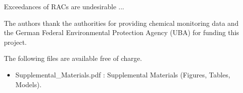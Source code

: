 \documentclass[journal=esthag,manuscript=article]{achemso}
\begin{document}







Exceedances of RACs are undesirable ...




\begin{acknowledgement}
The authors thank the authorities for providing chemical monitoring data and the German Federal Environmental Protection Agency (UBA) for funding this project.
\end{acknowledgement}


\begin{suppinfo}
The following files are available free of charge.
\begin{itemize}
  \item Supplemental\_Materials.pdf : Supplemental Materials (Figures, Tables, Models).
\end{itemize}
\end{suppinfo}




\end{document}
